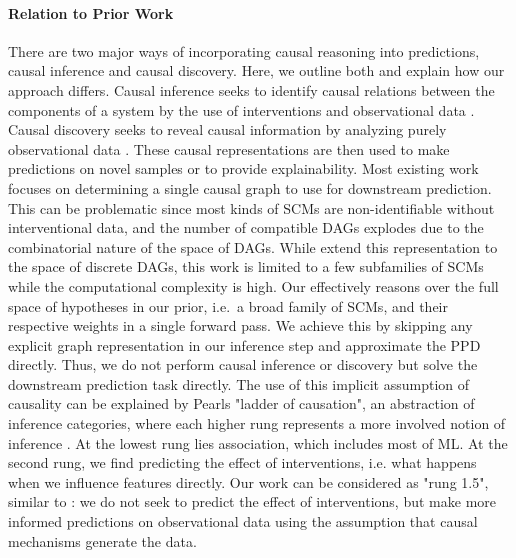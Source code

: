 \documentclass{article}
\begin{document}
\paragraph{Relation to Prior Work}
%
There are two major ways of incorporating causal reasoning into predictions, causal inference and causal discovery.
Here, we outline both and explain how our approach differs.
Causal inference seeks to identify causal relations between the components of a system by the use of interventions and observational data \citep{pearl2010causal}.
Causal discovery seeks to reveal causal information by analyzing purely observational data \citep{zhang2018learning}.
These causal representations are then used to make predictions on novel samples or to provide explainability.
Most existing work focuses on determining a single causal graph to use for downstream prediction.
This can be problematic since most kinds of SCMs are non-identifiable without interventional data, and the number of compatible DAGs explodes due to the combinatorial nature of the space of DAGs.
While \cite{annadani2021variational} extend this representation to the space of discrete DAGs, this work is limited to a few subfamilies of SCMs while the computational complexity is high.
Our \methodname{} effectively reasons over the full space of hypotheses in our prior, i.e.\ a broad family of SCMs, and their respective weights in a single forward pass.
We achieve this by skipping any explicit graph representation in our inference step and approximate the PPD directly.
Thus, we do not perform causal inference or discovery but solve the downstream prediction task directly.
The use of this implicit assumption of causality can be explained by Pearl\textquotesingle{}s "ladder of causation", an abstraction of inference categories, where each higher rung represents a more involved notion of inference \citep{PearlMackenzie18}. At the lowest rung lies association, which includes most of ML. At the second rung, we find predicting the effect of interventions, i.e. what happens when we influence features directly. %
Our work can be considered as "rung 1.5", similar to \cite{NEURIPS2020_1068bceb, SchaarMiracleCDL}: we do not seek to predict the effect of interventions, but make more informed predictions on observational data using the assumption that causal mechanisms generate the data.
\end{document}
